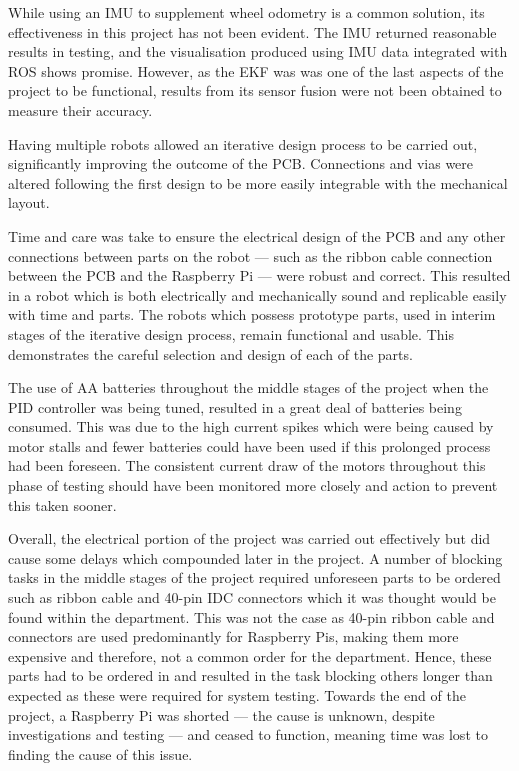 While using an IMU to supplement wheel odometry is a common solution, its 
effectiveness in this project has not been evident. The IMU 
returned reasonable results in testing, and the visualisation produced using 
IMU data integrated with ROS shows promise. However, as the EKF was was one of the last aspects of the project to be functional, results from its sensor fusion were not been obtained to 
measure their accuracy.

Having multiple robots allowed an 
iterative design process to be carried out, significantly improving the outcome 
of the PCB. Connections and vias were altered following the first design to be 
more easily integrable with the mechanical layout.

Time and care was take to ensure the electrical design of the PCB and any other 
connections between parts on the robot --- such as the ribbon cable connection 
between the PCB and the Raspberry Pi --- were robust and correct. This resulted 
in a robot which is both electrically and mechanically sound and replicable 
easily with time and parts. The robots which possess prototype parts, used in 
interim stages of the iterative design process, remain functional and usable. 
This demonstrates the careful selection and design of each of the parts. 

The use of AA batteries throughout the middle stages of the project when the PID 
controller was being tuned, resulted in a great deal of batteries being consumed. 
This was due to the high current spikes which were being caused by motor stalls and 
fewer batteries could have been used if this prolonged process had been foreseen. The 
consistent current draw of the motors throughout this phase of testing should have 
been monitored more closely and action to prevent this taken sooner.   

Overall, the electrical portion of the project was carried out effectively but did 
cause some delays which compounded later in the project. A number of 
blocking tasks in the middle stages of the project required unforeseen parts to be 
ordered such as ribbon cable and 40-pin IDC connectors which it was thought would 
be found within the department. This was not the case as 40-pin ribbon cable and 
connectors are used predominantly for Raspberry Pis, making them more expensive 
and therefore, not a common order for the department. Hence, these parts had to be ordered in and resulted in the task blocking 
others longer than expected as these were required for system testing. Towards the end of the project, a Raspberry Pi was 
shorted --- the cause is unknown, despite investigations and testing --- and ceased to function, 
meaning time was lost to finding the cause of this issue.    
 
